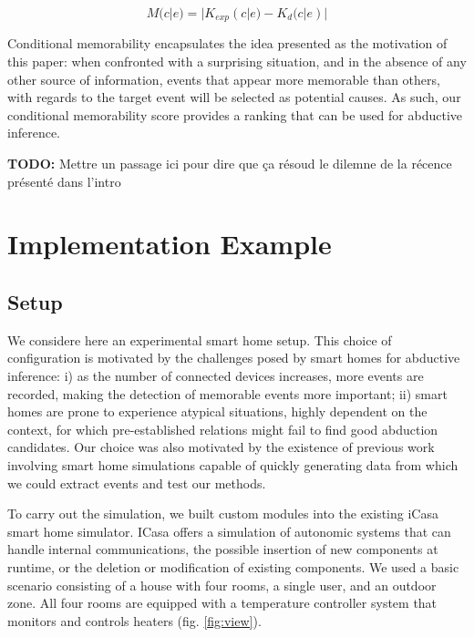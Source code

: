 \documentclass[conference]{IEEEtran}
\begin{document}
\begin{equation}
\label{eq:cond_mem}
M(c|e) = |K_{exp}(c|e) - K_d(c|e)|
\end{equation}

Conditional memorability encapsulates the idea
presented as the motivation of this paper: when confronted with a surprising
situation, and in the absence of any other source of information, events that appear more memorable than others, with regards to the target event will be selected as potential causes. As such, our conditional memorability score provides a ranking that can be used for abductive inference.

\textbf{TODO:} Mettre un passage ici pour dire que ça résoud le dilemne de la récence présenté dans l'intro

\section{Implementation Example}
\label{sec:example}
\subsection{Setup}
We considere here an experimental smart home setup. This choice of
configuration is motivated by the challenges posed by smart homes for abductive
inference: i) as the number of connected devices increases, more events are
recorded, making the detection of memorable events more important; ii) smart
homes are prone to experience atypical situations, highly dependent on the context,
for which pre-established relations might fail to find good abduction
candidates. Our choice was also motivated by
the existence of previous work involving smart home simulations capable of quickly generating data from which we could extract events and test our methods.



To carry out the simulation, we built custom modules into the existing iCasa
smart home simulator\cite{lalanda_self-aware_2017}. ICasa
offers a simulation of autonomic systems that can handle internal communications,
the possible insertion of new components at runtime, or the deletion or modification of existing
components. We used a basic scenario consisting of a house with four rooms,
a single user, and an outdoor zone. All four rooms are equipped
with a temperature controller system that monitors and controls heaters (fig.
\ref{fig:view}).
\end{document}
